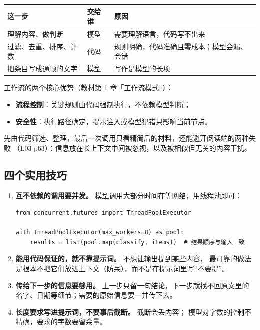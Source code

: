 \begin{center}
\begin{tabular}{p{4.5cm} p{2cm} p{8cm}}
  \toprule
  这一步 & 交给谁 & 原因 \\
  \midrule
  理解内容、做判断 & 模型 & 需要理解语言，代码写不出来 \\
  过滤、去重、排序、计数 & 代码 & 规则明确，代码准确且零成本；模型会漏、会错 \\
  把条目写成通顺的文字 & 模型 & 写作是模型的长项 \\
  \bottomrule
\end{tabular}
\end{center}

工作流的两个核心优势（教材第 1 章「工作流模式」）：
\begin{itemize}
  \item \textbf{流程控制}：关键规则由代码强制执行，不依赖模型判断；
  \item \textbf{安全性}：执行路径确定，提示注入或模型犯错只影响当前节点。
\end{itemize}

先由代码筛选、整理，最后一次调用只看精简后的材料，还能避开阅读端的两种失败
（L03 p63）：信息放在长上下文中间被忽视，以及被相似但无关的内容干扰。

\subsection{四个实用技巧}

\begin{enumerate}
  \item \textbf{互不依赖的调用要并发。} 模型调用大部分时间在等网络，用线程池即可：
\begin{lstlisting}[style=agenttext]
from concurrent.futures import ThreadPoolExecutor

with ThreadPoolExecutor(max_workers=8) as pool:
    results = list(pool.map(classify, items))  # 结果顺序与输入一致
\end{lstlisting}
  \item \textbf{能用代码保证的，就不靠提示词。} 不想让输出提到某些内容，
        最可靠的做法是根本不把它们放进上下文（防呆），而不是在提示词里写“不要提”。
  \item \textbf{传给下一步的信息要够用。} 上一步只留一句结论，下一步就找不回原文里的
        名字、日期等细节；需要的原始信息要一并传下去。
  \item \textbf{长度要求写进提示词，不要事后截断。} 截断会丢内容；
        模型对字数的控制不精确，要求的字数要留余量。
\end{enumerate}

